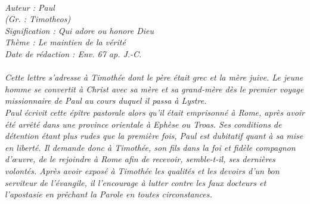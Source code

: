 \BFont
\noindent\hrulefill
{\footnotesize
\textit{
\bigskip
{\centering{}
\\Auteur : Paul
\\(Gr. : Timotheos)
\\Signification : Qui adore ou honore Dieu
\\Thème : Le maintien de la vérité
\\Date de rédaction : Env. 67 ap. J.-C.\\}
}
\textit{
\\Cette lettre s'adresse à Timothée dont le père était grec et la mère juive. Le jeune homme se convertit à Christ avec sa
mère et sa grand-mère dès le premier voyage missionnaire de Paul au cours duquel il passa à Lystre.
\\Paul écrivit cette épître pastorale alors qu'il était emprisonné à Rome, après avoir été arrêté dans une province orientale à Ephèse ou Troas.
Ses conditions de détention étant plus rudes que la première fois, Paul est dubitatif quant à sa mise en liberté. Il
demande donc à Timothée, son fils dans la foi et fidèle compagnon d'œuvre, de le rejoindre à Rome afin de
recevoir, semble-t-il, ses dernières volontés. Après avoir exposé à Timothée les qualités et les devoirs d'un bon serviteur de l'évangile, il l'encourage à lutter contre les faux docteurs et l'apostasie en prêchant la Parole en toutes circonstances.\bigskip
}
}
\par\nobreak\noindent\hrulefill

